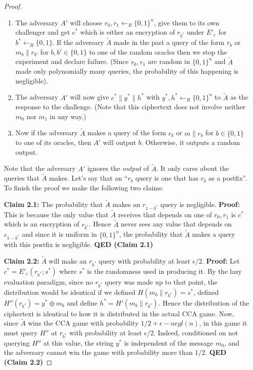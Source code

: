 \begin{proof}
\begin{enumerate}
\def\labelenumi{\arabic{enumi}.}
\item
  The adversary \(A'\) will choose \(r_0,r_1 \leftarrow_R \{0,1\}^n\),
  give them to its own challenger and get \(c^*\) which is either an
  encryption of \(r_{b^*}\) under \(E'_e\) for
  \(b^* \leftarrow_R \{0,1\}\). If the adversary \(\tilde{A}\) made in
  the past a query of the form \(r_b\) or \(m_b\|r_{b'}\) for
  \(b,b' \in \{0,1\}\) to one of the random oracles then we stop the
  experiment and declare failure. (Since \(r_0,r_1\) are random in
  \(\{0,1\}^n\) and \(\tilde{A}\) made only polynomially many queries,
  the probability of this happening is negligible).
\item
  The adversary \(A'\) will now give \(c^* \| y^* \| h^*\) with
  \(y^*,h^* \leftarrow_R \{0,1\}^n\) to \(\tilde{A}\) as the response to
  the challenge. (Note that this ciphertext does not involve neither
  \(m_0\) nor \(m_1\) in any way.)
\item
  Now if the adversary \(\tilde{A}\) makes a query of the form \(r_b\)
  or \(m\|r_b\) for \(b\in \{0,1\}\) to one of its oracles, then \(A'\)
  will output \(b\). Otherwise, it outputs a random output.
\end{enumerate}

Note that the adversary \(A'\) ignores the \emph{output} of
\(\tilde{A}\). It only cares about the queries that \(\tilde{A}\) makes.
Let's say that an ``\(r_b\) query is one that has \(r_b\) as a
postfix''. To finish the proof we make the following two claims:

\textbf{Claim 2.1:} The probability that \(\tilde{A}\) makes an
\(r_{1-b^*}\) query is negligible. \textbf{Proof:} This is because the
only value that \(\tilde{A}\) receives that depends on one of
\(r_0,r_1\) is \(c^*\) which is an encryption of \(r_{b^*}\). Hence
\(\tilde{A}\) never sees any value that depends on \(r_{1-b^*}\) and
since it is uniform in \(\{0,1\}^n\), the probability that \(\tilde{A}\)
makes a query with this postfix is negligible. \textbf{QED (Claim 2.1)}

\textbf{Claim 2.2:} \(\tilde{A}\) will make an \(r_{b^*}\) query with
probability at least \(\epsilon/2\). \textbf{Proof:} Let
\(c^* = E'_e(r_{b^*} ; s^*)\) where \(s^*\) is the randomness used in
producing it. By the lazy evaluation paradigm, since no \(r_{b^*}\)
query was made up to that point, the distribution would be identical if
we defined \(H(m_b\|r_{b^*})=s^*\), defined
\(H''(r_{b^*}) = y^* \oplus m_b\) and define \(h^* = H'(m_b\|r_{b^*})\).
Hence the distribution of the ciphertext is identical to how it is
distributed in the actual CCA game. Now, since \(\tilde{A}\) wins the
CCA game with probability \(1/2 + \epsilon - negl(n)\), in this game it
must query \(H''\) at \(r_{b^*}\) with probability at least
\(\epsilon/2\). Indeed, conditioned on not querying \(H''\) at this
value, the string \(y^*\) is independent of the message \(m_0\), and the
adversary cannot win the game with probability more than \(1/2\).
\textbf{QED (Claim 2.2)}


\end{proof}
